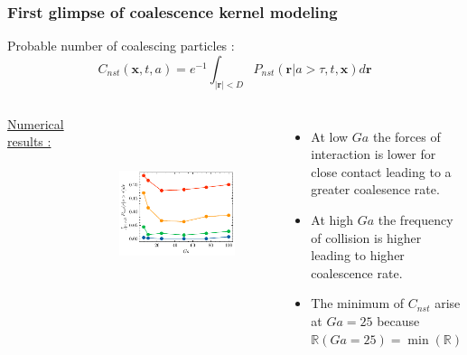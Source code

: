 \documentclass{sintefbeamer}
\begin{document}
\begin{frame}
  \frametitle{First glimpse of coalescence kernel modeling}
  Probable number of coalescing particles : 
  \begin{equation*}
    C_{nst}(\textbf{x},t,a) 
    = e^{-1}\int_{|\textbf{r}|<D} P_{nst}(\textbf{r}| a > \tau,t,\textbf{x})d\textbf{r}
  \end{equation*}
  \begin{columns}
    \underline{Numerical results :}
    \vfill
    \begin{figure}
      \includegraphics[height=0.8\textwidth]{image/HOMOGENEOUS/fPA/Proba.pdf}
    \end{figure}
    \begin{itemize}
      \item At low $Ga$ the forces of interaction is lower for close contact leading to a greater coalesence rate. 
      \item At high $Ga$ the frequency of collision is higher leading to higher coalescence rate. 
      \item The minimum of $C_{nst}$ arise at  $Ga =25$ because $\mathbb{R}(Ga=25)=\min(\mathbb{R})$
    \end{itemize}
  \end{columns}
\end{frame}
\end{document}
